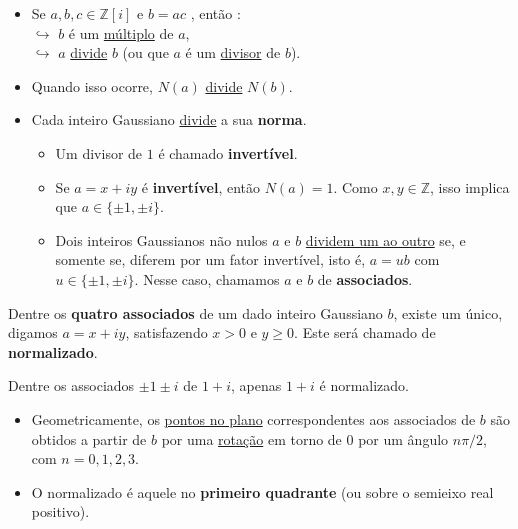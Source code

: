     \begin{itemize}[left=0.5cm, align=left, nosep]
        \item Se $a, b, c \in \mathbb{Z}[i]$ e $b = ac$ , então : \\   
            $\hookrightarrow$ $b$ é um \underline{múltiplo} de $a$, \\
            $\hookrightarrow$ $a$ \underline{divide} $b$ (ou que $a$ é um \underline{divisor} de $b$).   
        \item Quando isso ocorre, $N(a)$ \underline{divide} $N(b)$.  
        \item Cada inteiro Gaussiano \underline{divide} a sua \textbf{norma}.  
        \begin{itemize}[left=0.5cm, align=left, nosep]
            \item Um divisor de $1$ é chamado \textbf{invertível}.  
            \item Se $a = x + iy$ é \textbf{invertível}, então $N(a) = 1$. Como $x, y \in \mathbb{Z}$, isso implica que $a \in \{\pm 1, \pm i\}$.  
            \item Dois inteiros Gaussianos não nulos $a$ e $b$ \underline{dividem um ao outro} se, e somente se, diferem por um fator invertível, isto é, $a = ub$ com $u \in \{\pm 1, \pm i\}$. Nesse caso, chamamos $a$ e $b$ de \textbf{associados}.  
        \end{itemize}
    \end{itemize}  

    Dentre os \textbf{quatro associados} de um dado inteiro Gaussiano $b$, existe um único, digamos $a = x + iy$, satisfazendo $x > 0$ e $y \geq 0$. Este será chamado de \textbf{normalizado}.  

    \begin{exemplo}
    Dentre os associados $\pm 1 \pm i$ de $1+i$, apenas $\boxed{1+i}$ é normalizado.      
    \end{exemplo}

    \begin{itemize}[left=0.5cm, align=left, nosep]
        \item Geometricamente, os \underline{pontos no plano} correspondentes aos associados de $b$ são obtidos 
        a partir de $b$ por uma \underline{rotação} em torno de $0$ por um ângulo $n\pi/2$, com $n = 0,1,2,3$. 
        \item O normalizado é aquele no \textbf{primeiro quadrante} (ou sobre o semieixo real positivo).  
    \end{itemize}

